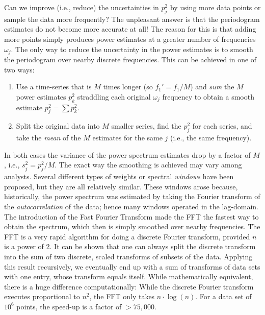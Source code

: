  	Can we improve (i.e., reduce) the uncertainties in $p^2_j$ by using more data points or sample the 
data more frequently?  The unpleasant answer is that the periodogram estimates do not become 
more accurate at all!  The reason for this is that adding more points simply produces power 
estimates at a greater number of frequencies $\omega_j$.  The only way to reduce the uncertainty in the 
power estimates is to smooth the periodogram over nearby discrete frequencies.  This can be 
achieved in one of two ways:

\begin{enumerate}
\item	Use a time-series that is $M$ times longer (so $f_1' = f_1/M$) and \emph{sum} the $M$ power estimates $p^2_k$
straddling each original $\omega_j$ frequency to obtain a smooth estimate $p^2_j = \sum p^2_k$.
\item	Split the original data into $M$ smaller series, find the $p^2_j$ for each series, and take the \emph{mean} of 
the $M$ estimates for the same $j$ (i.e., the same frequency).
\end{enumerate}
In both cases the variance of the power spectrum estimates drop by a factor of $M$, i.e., $s^2_j = p^2_j/M$.
The exact way the smoothing is achieved may vary among analysts.  Several different 
types of weights or spectral \emph{windows} have been proposed, but they are all relatively similar.  These windows 
arose because, historically, the power spectrum was estimated by taking the Fourier transform of 
the \emph{autocorrelation} of the data; hence many windows operated in the lag-domain.  The 
introduction of the Fast Fourier Transform made the FFT the fastest way to obtain the spectrum, 
which then is simply smoothed over nearby frequencies.  The FFT is a very rapid algorithm for 
doing a discrete Fourier transform, provided $n$ is a power of 2.  It can be shown that one can 
always split the discrete transform into the sum of two discrete, scaled transforms of subsets of the data.  
Applying this result recursively, we eventually end up with a sum of transforms of data sets 
with one entry, whose transform equals itself.  While mathematically equivalent, there is a huge 
difference computationally:  While the discrete Fourier transform executes proportional to $n^2$, 
the FFT only takes $n\cdot \log(n)$.  For a data set of $10^6$ points, the speed-up is a factor of $> 75,000$.

